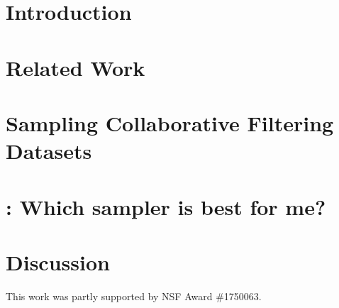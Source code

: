 \documentclass[sigconf]{acmart}
\begin{document}



\maketitle

\section{Introduction} 
\section{Related Work} 
\section{Sampling Collaborative Filtering Datasets} 
\section{\oracle: Which sampler is best for me?} 
\section{Discussion} 

\begin{acks}
This work was partly supported by NSF Award \#1750063.
\end{acks}
\end{document}
